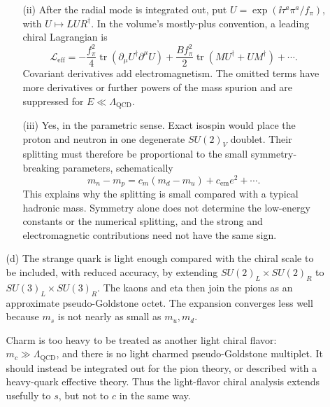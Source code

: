 \begin{enumerate}
\begin{enumerate}
\begin{enumerate}
      \item[(ii)]
      After the radial mode is integrated out, put
      \(U=\exp(\ii\tau^a\pi^a/f_\pi)\), with
      \(U\mapsto LUR^\dagger\).  In the volume's mostly-plus convention, a
      leading chiral Lagrangian is
      \[
        \boxed{
        \mathcal L_{\mathrm{eff}}
          =-\frac{f_\pi^2}{4}
             \operatorname{tr}(\partial_\mu U^\dagger\partial^\mu U)
           +\frac{Bf_\pi^2}{2}
             \operatorname{tr}(MU^\dagger+UM^\dagger)+\cdots.}
      \]
      Covariant derivatives add electromagnetism.  The omitted terms have
      more derivatives or further powers of the mass spurion and are
      suppressed for \(E\ll\Lambda_{\mathrm{QCD}}\).

      \item[(iii)]
      Yes, in the parametric sense.  Exact isospin would place the proton and
      neutron in one degenerate \(SU(2)_V\) doublet.  Their splitting must
      therefore be proportional to the small symmetry-breaking parameters,
      schematically
      \[
        m_n-m_p=c_m(m_d-m_u)+c_{\mathrm{em}}e^2+\cdots.
      \]
      This explains why the splitting is small compared with a typical
      hadronic mass.  Symmetry alone does not determine the low-energy
      constants or the numerical splitting, and the strong and
      electromagnetic contributions need not have the same sign.
    \end{enumerate}

    \item[(d)]
    The strange quark is light enough compared with the chiral scale to be
    included, with reduced accuracy, by extending
    \(SU(2)_L\times SU(2)_R\) to
    \(SU(3)_L\times SU(3)_R\).  The kaons and eta then join the pions as an
    approximate pseudo-Goldstone octet.  The expansion converges less well
    because \(m_s\) is not nearly as small as \(m_u,m_d\).

    Charm is too heavy to be treated as another light chiral flavor:
    \(m_c\gg\Lambda_{\mathrm{QCD}}\), and there is no light charmed
    pseudo-Goldstone multiplet.  It should instead be integrated out for the
    pion theory, or described with a heavy-quark effective theory.  Thus the
    light-flavor chiral analysis extends usefully to \(s\), but not to \(c\)
    in the same way.
  \end{enumerate}


\end{enumerate}
